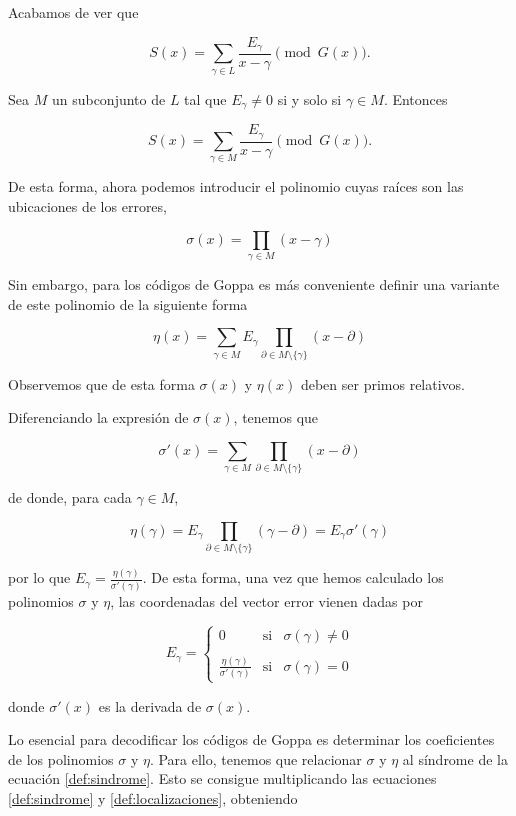 Acabamos de ver que 

$$S(x) = \sum_{\gamma \in L} \frac{E_\gamma}{x - \gamma} \pmod{G(x)}.$$

Sea $M$ un subconjunto de $L$ tal que $E_{\gamma} \neq 0$ si y solo si $\gamma \in M$. Entonces

\begin{equation}
    \label{def:sindrome}
    S(x) = \sum_{\gamma \in M} \frac{E_\gamma}{x - \gamma} \pmod{G(x)}.
\end{equation}

De esta forma, ahora podemos introducir el polinomio cuyas raíces son las ubicaciones de los errores,

\begin{equation}
    \label{def:localizaciones}
    \sigma (x) = \prod_{\gamma \in M} (x - \gamma)
\end{equation}

Sin embargo, para los códigos de Goppa es más conveniente definir una variante de este polinomio de la siguiente forma

$$\eta (x) = \sum_{\gamma \in M} E_\gamma \prod_{\partial \in M \setminus \{ \gamma \} } (x - \partial)$$

Observemos que de esta forma $\sigma(x)$ y $\eta(x)$ deben ser primos relativos.

Diferenciando la expresión de $\sigma(x)$, tenemos que 

$$\sigma'(x) = \sum_{\gamma \in M} \prod_{\partial \in M \setminus \{ \gamma \} } (x - \partial)$$

de donde, para cada $\gamma \in M$,

$$\eta (\gamma) = E_\gamma \prod_{\partial \in M \setminus \{ \gamma \} } (\gamma - \partial) = E_\gamma \sigma'(\gamma)$$

por lo que $E_\gamma = \frac{\eta(\gamma)}{\sigma'(\gamma)}$. De esta forma, una vez que hemos calculado los polinomios $\sigma$ y $\eta$, las coordenadas del vector error vienen dadas por 

\[
    E_\gamma = \left\{ \begin{array}{lcc}
    0 &   \text{si}  & \sigma(\gamma) \neq 0 \\
    \\ \frac{\eta(\gamma)}{\sigma'(\gamma)} &  \text{si} & \sigma(\gamma) = 0
    \end{array}
    \right.
\]

donde $\sigma'(x)$ es la derivada de $\sigma(x)$.

Lo esencial para decodificar los códigos de Goppa es determinar los coeficientes de los polinomios $\sigma$ y $\eta$. Para ello, tenemos que relacionar $\sigma$ y $\eta$ al síndrome de la ecuación \ref{def:sindrome}. Esto se consigue multiplicando las ecuaciones \ref{def:sindrome} y \ref{def:localizaciones}, obteniendo

